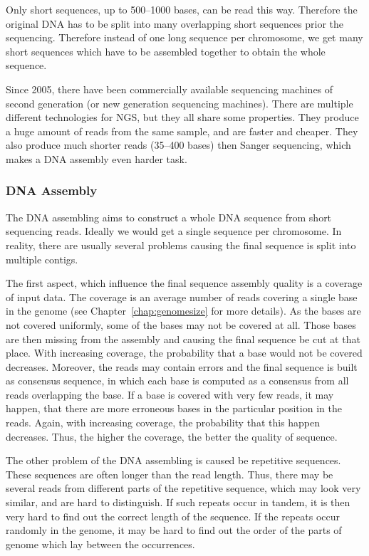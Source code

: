 Only short sequences, up to 500--1000 bases, can be read this way. Therefore the original DNA has to be split into many overlapping short sequences prior the sequencing.
Therefore instead of one long sequence per chromosome, we get many short sequences which have to be assembled together to obtain the whole sequence.

Since 2005, there have been commercially available sequencing machines of second generation (or new generation sequencing machines). There are multiple different technologies for NGS, but they all share some properties.
They produce a huge amount of reads from the same sample, and are faster and cheaper. They also produce much shorter reads (35--400 bases) then Sanger sequencing, which makes a DNA assembly even harder task.

\subsubsection{DNA Assembly}


The DNA assembling aims to construct a whole DNA sequence from short sequencing reads. Ideally we would get a single sequence per chromosome. In reality, there are usually several problems causing the final sequence is split into multiple contigs.

The first aspect, which influence the final sequence assembly quality is a coverage of input data. The coverage is an average number of reads covering a single base in the genome (see Chapter~\ref{chap:genomesize} for more details).
As the bases are not covered uniformly, some of the bases may not be covered at all. Those bases are then missing from the assembly and causing the final sequence be cut at that place. With increasing coverage, the probability that a base would not be covered decreases.
Moreover, the reads may contain errors and the final sequence is built as consensus sequence, in which each base is computed as a consensus from all reads overlapping the base. If a base is covered with very few reads, it may happen, that there are more erroneous bases in the particular position in the reads. Again, with increasing coverage, the probability that this happen decreases. Thus, the higher the coverage, the better the quality of sequence.

The other problem of the DNA assembling is caused be repetitive sequences. These sequences are often longer than the read length. Thus, there may be several reads from different parts of the repetitive sequence, which may look very similar, and are hard to distinguish. If such repeats occur in tandem, it is then very hard to find out the correct length of the sequence. If the repeats occur randomly in the genome, it may be hard to find out the order of the parts of genome which lay between the occurrences.

